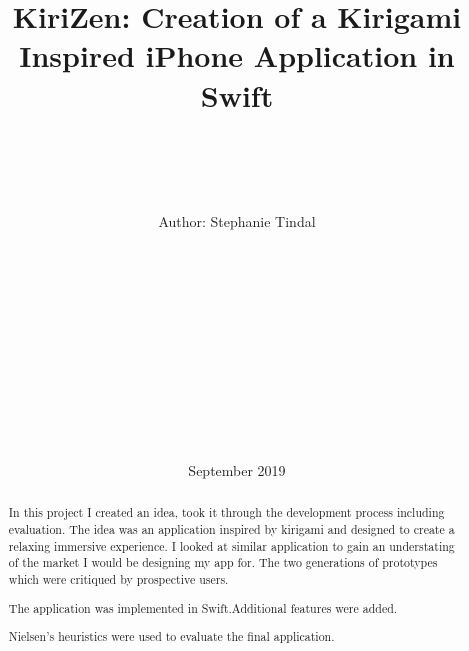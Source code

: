 \documentclass[11pt]{article}
\begin{document}
\begin{titlepage}
    \title{\vspace{40pt}\Huge KiriZen: Creation of a Kirigami Inspired iPhone Application in Swift}

    \author{ \\\hline \\\\\\ \Large \vspace{5pt} Author: Stephanie Tindal \\\Large \vspace{5pt}{Student ID: 1936508}\\\Large \vspace{50pt}{Supervisor: Achim Jung} \\ \hline\\\\\\  \vspace{5pt}{MSc Computer Science} \\ \vspace{5pt}{School of Computer Science, University of Birmingham}\\\\\\ \hline\\\\}

    \date{September 2019 \vspace{20pt}}
    \maketitle

\end{titlepage}
    \tableofcontents


\newpage

\begin{abstract}
    In this project I created an idea, took it through the development process including evaluation. The idea was an application inspired by kirigami and designed to create a relaxing immersive experience. 
    I looked at similar application to gain an understating of the market I would be designing my app for. 
    The two generations of prototypes which were critiqued by prospective users.
    
    The application was implemented in Swift.Additional features were added. 
    
    Nielsen's heuristics were used to evaluate the final application. 

\end{abstract}
\end{document}
